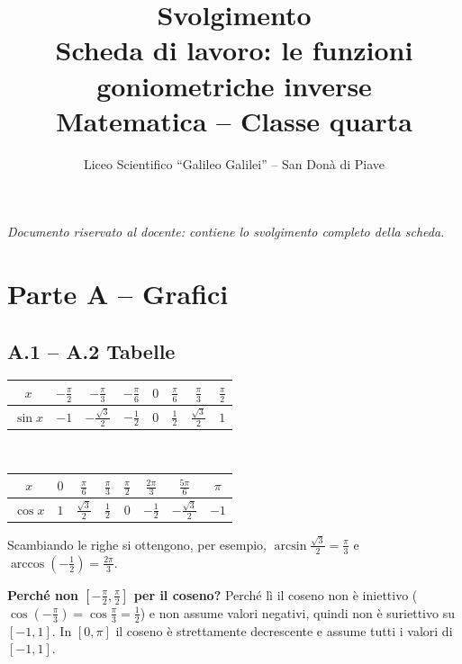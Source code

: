 \documentclass[11pt,a4paper]{article}
\title{\textbf{Svolgimento} \\ \large Scheda di lavoro: le funzioni goniometriche inverse \\ Matematica -- Classe quarta}
\author{Liceo Scientifico ``Galileo Galilei'' -- San Don\`a di Piave}
\date{}
\begin{document}
\maketitle
\vspace{-1cm}
\noindent\textit{Documento riservato al docente: contiene lo svolgimento completo della scheda.}

\section*{Parte A -- Grafici}

\subsection*{A.1 -- A.2 Tabelle}
\begin{center}
\renewcommand{\arraystretch}{1.5}
\begin{tabular}{|c|*{7}{c|}}
\hline
$x$ & $-\frac{\pi}{2}$ & $-\frac{\pi}{3}$ & $-\frac{\pi}{6}$ & $0$ & $\frac{\pi}{6}$ & $\frac{\pi}{3}$ & $\frac{\pi}{2}$\\\hline
$\sin x$ & $-1$ & $-\frac{\sqrt3}{2}$ & $-\frac12$ & $0$ & $\frac12$ & $\frac{\sqrt3}{2}$ & $1$\\\hline
\end{tabular}
\\[6pt]
\begin{tabular}{|c|*{7}{c|}}
\hline
$x$ & $0$ & $\frac{\pi}{6}$ & $\frac{\pi}{3}$ & $\frac{\pi}{2}$ & $\frac{2\pi}{3}$ & $\frac{5\pi}{6}$ & $\pi$\\\hline
$\cos x$ & $1$ & $\frac{\sqrt3}{2}$ & $\frac12$ & $0$ & $-\frac12$ & $-\frac{\sqrt3}{2}$ & $-1$\\\hline
\end{tabular}
\end{center}
Scambiando le righe si ottengono, per esempio, $\arcsin\frac{\sqrt3}{2}=\frac{\pi}{3}$ e $\arccos\left(-\frac12\right)=\frac{2\pi}{3}$.

\noindent\textbf{Perch\'e non $\left[-\frac{\pi}{2},\frac{\pi}{2}\right]$ per il coseno?} Perch\'e l\`i il coseno non \`e iniettivo ($\cos\left(-\frac{\pi}{3}\right)=\cos\frac{\pi}{3}=\frac12$) e non assume valori negativi, quindi non \`e suriettivo su $[-1,1]$. In $[0,\pi]$ il coseno \`e strettamente decrescente e assume tutti i valori di $[-1,1]$.
\end{document}
